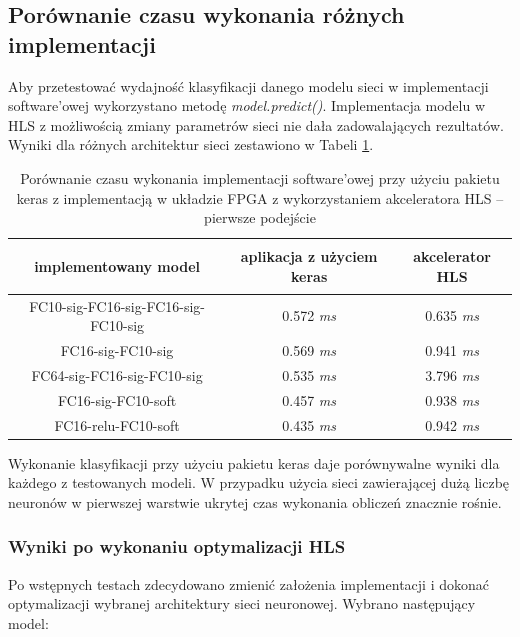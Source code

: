 \subsection{Porównanie czasu wykonania różnych implementacji}

Aby przetestować wydajność klasyfikacji danego modelu sieci w implementacji software'owej wykorzystano metodę \emph{model.predict()}.
Implementacja modelu w HLS z możliwością zmiany parametrów sieci nie dała zadowalających rezultatów. Wyniki dla różnych architektur sieci zestawiono w Tabeli \ref{tab:czas-wykonania}. 

\begin{table}[h] \centering
  \caption{Porównanie czasu wykonania implementacji software'owej przy użyciu pakietu keras z implementacją w układzie FPGA z wykorzystaniem akceleratora HLS -- pierwsze podejście}
  \centering
  \begin{tabular} {c|c|c} \hline \label{tab:czas-wykonania}
      
    implementowany model & aplikacja z użyciem keras & akcelerator HLS\\ \hline
    FC10-sig-FC16-sig-FC16-sig-FC10-sig & 0.572 \emph{ms} & 0.635 \emph{ms} \\
    FC16-sig-FC10-sig & 0.569 \emph{ms} & 0.941 \emph{ms} \\
    FC64-sig-FC16-sig-FC10-sig & 0.535 \emph{ms} & 3.796 \emph{ms} \\
    FC16-sig-FC10-soft & 0.457 \emph{ms} & 0.938 \emph{ms} \\
    FC16-relu-FC10-soft & 0.435 \emph{ms} & 0.942 \emph{ms} \\
    \end{tabular}
  \end{table}

  Wykonanie klasyfikacji przy użyciu pakietu keras daje porównywalne wyniki dla każdego z testowanych modeli. W przypadku użycia sieci zawierającej dużą liczbę neuronów w pierwszej warstwie ukrytej czas wykonania obliczeń znacznie rośnie.


  \subsubsection{Wyniki po wykonaniu optymalizacji HLS}
  Po wstępnych testach zdecydowano zmienić założenia implementacji i dokonać optymalizacji wybranej architektury sieci neuronowej. Wybrano następujący model:

